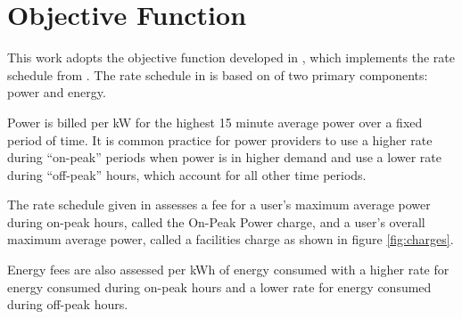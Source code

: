 \section{Objective Function\label{sec:objective}}
This work adopts the objective function developed in \cite{mortensen_comprehensive_2021}, which implements the rate schedule from \cite{rocky_mountain_power_rocky_2021}. The rate schedule in \cite{rocky_mountain_power_rocky_2021} is based on of two primary components: power and energy.  
\par Power is billed per kW for the highest 15 minute average power over a fixed period of time. It is common practice for power providers to use a higher rate during ``on-peak'' periods when power is in higher demand and use a lower rate during ``off-peak'' hours, which account for all other time periods. 
\par The rate schedule given in \cite{rocky_mountain_power_rocky_2021} assesses a fee for a user's maximum average power during on-peak hours, called the On-Peak Power charge, and a user's overall maximum average power, called a facilities charge as shown in figure \ref{fig:charges}. 
\par Energy fees are also assessed per kWh of energy consumed with a higher rate for energy consumed during on-peak hours and a lower rate for energy consumed during off-peak hours.


